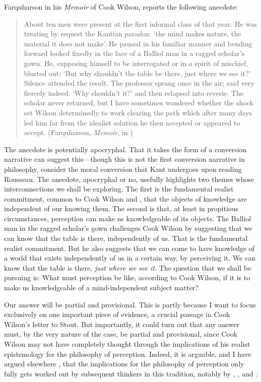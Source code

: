 \documentclass[12pt]{article}
\begin{document}
Farquharson in his \emph{Memoir} of Cook Wilson, reports the following anecdote:
\begin{quote}
	About ten men were present at the first informal class of that year. He was treating by request the Kantian paradox: `the mind makes nature, the material it does not make'. He paused in his familiar manner and bending forward looked fixedly in the face of a Balliol man in a ragged scholar's gown. He, supposing himself to be interrogated or in a spirit of mischief, blurted out: `But why shouldn't the table be there, just where we see it?' Silence attended the result. The professor sprang once in the air; said very fiercely indeed: `Why shouldn't it?' and then relapsed into reverie. The scholar never returned, but I have sometimes wondered whether the shock set Wilson determinedly to work clearing the path which after many days led him far from the idealist solution he then accepted or appeared to accept. (Farquharson, \emph{Memoir}, in \citealt[xix]{Cook-Wilson:1926sf})
\end{quote}
The anecdote is potentially apocryphal. That it takes the form of a conversion narrative can suggest this---though this is not the first conversion narrative in philosophy, consider the moral conversion that Kant undergoes upon reading Rousseau. The anecdote, apocryphal or no, usefully highlights two themes whose interconnections we shall be exploring. The first is the fundamental realist commitment, common to Cook Wilson and \citet{Moore:1903uo}, that the objects of knowledge are independent of our knowing them. The second is that, at least in propitious circumstances, perception can make us knowledgeable of its objects. The Balliol man in the ragged scholar's gown challenges Cook Wilson by suggesting that we can know that the table is there, independently of us. That is the fundamental realist commitment. But he also suggests that we can come to have knowledge of a world that exists independently of us in a certain way, by perceiving it. We can know that the table is there, \emph{just where we see it}. The question that we shall be pursuing is: What must perception be like, according to Cook Wilson, if it is to make us knowledgeable of a mind-independent subject matter? 

Our answer will be partial and provisional. This is partly because I want to focus exclusively on one important piece of evidence, a crucial passage in Cook Wilson's letter to Stout. But importantly, it could turn out that any answer must, by the very nature of the case, be partial and provisional, since Cook Wilson may not have completely thought through the implications of his realist epistemology for the philosophy of perception. Indeed, it is arguable, and I have argued elsewhere \citep{Kalderon:2010fk}, that the implications for the philosophy of perception only fully gets worked out by subsequent thinkers in this tradition, notably by \citet{Prichard:1938ve}, \citet{Austin:1962lr}, and \citet{Hinton:1973js}.
\end{document}

